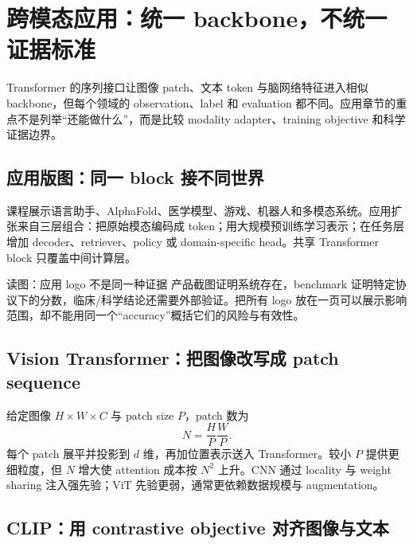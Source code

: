 \section{跨模态应用：统一 backbone，不统一证据标准}

Transformer 的序列接口让图像 patch、文本 token 与脑网络特征进入相似 backbone，但每个领域的 observation、label 和 evaluation 都不同。应用章节的重点不是列举“还能做什么”，而是比较 modality adapter、training objective 和科学证据边界。

\subsection{应用版图：同一 block 接不同世界}

课程展示语言助手、AlphaFold、医学模型、游戏、机器人和多模态系统。应用扩张来自三层组合：把原始模态编码成 token；用大规模预训练学习表示；在任务层增加 decoder、retriever、policy 或 domain-specific head。共享 Transformer block 只覆盖中间计算层。


\begin{knowledgebox}{读图：应用 logo 不是同一种证据}
产品截图证明系统存在，benchmark 证明特定协议下的分数，临床/科学结论还需要外部验证。把所有 logo 放在一页可以展示影响范围，却不能用同一个“accuracy”概括它们的风险与有效性。
\end{knowledgebox}

\subsection{Vision Transformer：把图像改写成 patch sequence}

给定图像 $H\times W\times C$ 与 patch size $P$，patch 数为
\[
N=\frac{H}{P}\frac{W}{P}.
\]
每个 patch 展平并投影到 $d$ 维，再加位置表示送入 Transformer。较小 $P$ 提供更细粒度，但 $N$ 增大使 attention 成本按 $N^2$ 上升。CNN 通过 locality 与 weight sharing 注入强先验；ViT 先验更弱，通常更依赖数据规模与 augmentation。


\subsection{CLIP：用 contrastive objective 对齐图像与文本}

